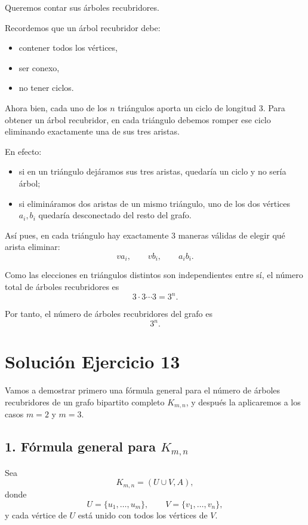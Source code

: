 \documentclass[12pt]{article}
\begin{document}
Queremos contar sus árboles recubridores.

\medskip

Recordemos que un árbol recubridor debe:
\begin{itemize}
    \item contener todos los vértices,
    \item ser conexo,
    \item no tener ciclos.
\end{itemize}

Ahora bien, cada uno de los \(n\) triángulos aporta un ciclo de longitud \(3\). Para obtener un árbol recubridor, en cada triángulo debemos romper ese ciclo eliminando exactamente una de sus tres aristas.

En efecto:
\begin{itemize}
    \item si en un triángulo dejáramos sus tres aristas, quedaría un ciclo y no sería árbol;
    \item si elimináramos dos aristas de un mismo triángulo, uno de los dos vértices \(a_i,b_i\) quedaría desconectado del resto del grafo.
\end{itemize}

Así pues, en cada triángulo hay exactamente \(3\) maneras válidas de elegir qué arista eliminar:
\[
va_i, \qquad vb_i, \qquad a_ib_i.
\]

Como las elecciones en triángulos distintos son independientes entre sí, el número total de árboles recubridores es
\[
3\cdot 3\cdots 3 = 3^n.
\]

Por tanto, el número de árboles recubridores del grafo es
\[
\boxed{3^n.}
\]

\section*{Solución Ejercicio 13}

Vamos a demostrar primero una fórmula general para el número de árboles recubridores de un grafo bipartito completo \(K_{m,n}\), y después la aplicaremos a los casos \(m=2\) y \(m=3\).

\subsection*{1. Fórmula general para \(K_{m,n}\)}

Sea
\[
K_{m,n}=(U\cup V, A),
\]
donde
\[
U=\{u_1,\dots,u_m\}, \qquad V=\{v_1,\dots,v_n\},
\]
y cada vértice de \(U\) está unido con todos los vértices de \(V\).
\end{document}
